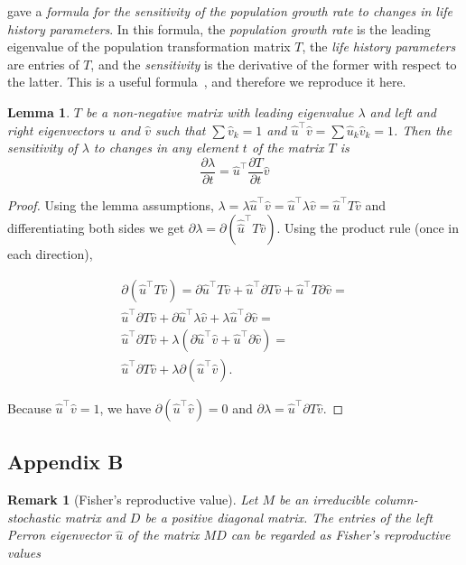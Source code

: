 \documentclass[9pt, a4paper, twocolumn]{extarticle}
\newcommand*{\tr}{^\intercal}
\newtheorem{lemma}{Lemma}
\newtheorem{remark}{Remark}
\begin{document}
\citet{Caswell1978} gave a \emph{formula for the sensitivity of the population growth rate to changes in life history parameters}.
In this formula, the \emph{population growth rate} is the leading eigenvalue of the population transformation matrix $T$, the \emph{life history parameters} are entries of $T$, and the \emph{sensitivity} is the derivative of the former with respect to the latter.
This is a useful formula~\citep[ch.~10]{Caswell1978,Hermisson2002,Ram2012,Otto2007}, and therefore we reproduce it here.

\begin{lemma}
$T$ be a non-negative matrix with leading eigenvalue $\lambda$ and left and right eigenvectors $\hat u$ and $\hat v$ such that $\sum{\hat v_k}=1$ and $\hat u\tr \hat v = \sum{\hat u_k \hat v_k} = 1$.
Then the sensitivity of $\lambda$ to changes in any element $t$ of the matrix $T$ is
\begin{equation}\label{eq:Caswells_formula}
\frac{\partial \lambda}{\partial t} = 
\hat u\tr \frac{\partial T}{\partial t} \hat v
\end{equation}
\end{lemma}

\begin{proof} 
Using the lemma assumptions,
$\lambda = \lambda \hat u\tr \hat v = \hat u\tr \lambda \hat v = \hat u\tr T \hat v$ and differentiating both sides we get $\partial \lambda = \partial (\hat \hat u\tr T \hat v)$.
Using the product rule (once in each direction),

\begin{multline}
\partial (\hat u\tr T \hat v) = 
\partial \hat u\tr T \hat v + \hat u\tr \partial T \hat v + \hat u\tr T \partial \hat v = \\
\hat u\tr \partial T \hat v + \partial \hat u\tr \lambda \hat v  + \lambda \hat u\tr \partial \hat v = \\
\hat u\tr \partial T \hat v + \lambda(\partial \hat u\tr \hat v  + \hat u\tr \partial \hat v) = \\
\hat u\tr \partial T \hat v + \lambda \partial(\hat u\tr \hat v).
\end{multline}

Because $\hat u\tr \hat v = 1$,
we have $\partial (\hat u\tr \hat v) = 0$ and
$\partial \lambda = \hat u\tr \partial T \hat v$.
\end{proof}

\subsection*{Appendix B}\label{sec:AppB}
\begin{remark}[Fisher's reproductive value]
Let $M$ be an irreducible column-stochastic matrix and $D$ be a positive diagonal matrix. 
The entries of the left \emph{Perron} eigenvector $\hat u$ of the matrix $MD$ can be regarded as \emph{Fisher's reproductive values}~\citep[pg.~27]{Fisher1930}
\end{remark}
\end{document}
